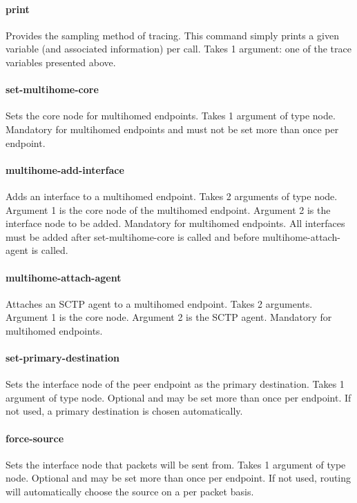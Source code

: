 	 \paragraph{print} Provides the sampling method of tracing. This
	 command simply prints a given variable (and associated
	 information) per call.  Takes 1 argument: one of the trace
	 variables presented above.

	 \paragraph{set-multihome-core} Sets the core node for multihomed
	 endpoints. Takes 1 argument of type node. Mandatory for
	 multihomed endpoints and must not be set more than once per
	 endpoint.

	 \paragraph{multihome-add-interface} Adds an interface to a multihomed
	 endpoint. Takes 2 arguments of type node. Argument 1 is the core
	 node of the multihomed endpoint. Argument 2 is the interface node
	 to be added. Mandatory for multihomed endpoints. All interfaces
	 must be added after set-multihome-core is called and before
	 multihome-attach-agent is called.

	 \paragraph{multihome-attach-agent} Attaches an SCTP agent to a
	 multihomed endpoint. Takes 2 arguments. Argument 1 is the core
	 node. Argument 2 is the SCTP agent. Mandatory for multihomed
	 endpoints.

	 \paragraph{set-primary-destination} Sets the interface node of the peer
	 endpoint as the primary destination. Takes 1 argument of type
	 node. Optional and may be set more than once per endpoint. If not
	 used, a primary destination is chosen automatically.

	 \paragraph{force-source} Sets the interface node that packets will be
	 sent from. Takes 1 argument of type node. Optional and may be set
	 more than once per endpoint. If not used, routing will
	 automatically choose the source on a per packet basis.


